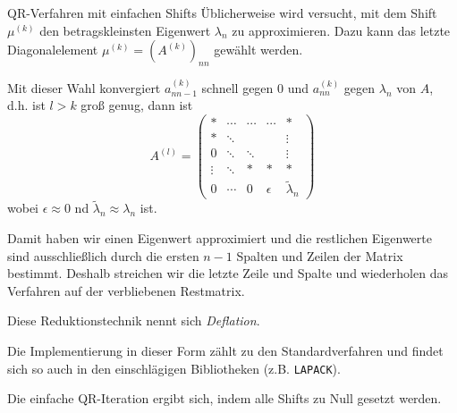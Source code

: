 \begin{defi}{QR-Verfahren mit einfachen Shifts}
    Üblicherweise wird versucht, mit dem Shift $\mu^{(k)}$ den betragskleinsten Eigenwert $\lambda_n$ zu approximieren.
    Dazu kann das letzte Diagonalelement $\mu^{(k)} = (A^{(k)})_{nn}$ gewählt werden.

    Mit dieser Wahl konvergiert $a^{(k)}_{nn-1}$ schnell gegen $0$ und $a^{(k)}_{nn}$ gegen $\lambda_n$ von $A$, d.h. ist $l > k$ groß genug, dann ist
    \[
        A^{(l)} = \begin{pmatrix}
            *      & \cdots & \cdots & \cdots   & *                 \\
            *      & \ddots &        &          & \vdots            \\
            0      & \ddots & \ddots &          & \vdots            \\
            \vdots & \ddots & *      & *        & *                 \\
            0      & \cdots & 0      & \epsilon & \tilde{\lambda}_n
        \end{pmatrix}
    \]
    wobei $\epsilon \approx 0$ nd $\tilde{\lambda}_n \approx \lambda_n$ ist.

    Damit haben wir einen Eigenwert approximiert und die restlichen Eigenwerte sind ausschließlich durch die ersten $n-1$ Spalten und Zeilen der Matrix bestimmt.
    Deshalb streichen wir die letzte Zeile und Spalte und wiederholen das Verfahren auf der verbliebenen Restmatrix.

    Diese Reduktionstechnik nennt sich \emph{Deflation}.

    Die Implementierung in dieser Form zählt zu den Standardverfahren und findet sich so auch in den einschlägigen Bibliotheken (z.B. \texttt{LAPACK}).

    Die einfache QR-Iteration ergibt sich, indem alle Shifts zu Null gesetzt werden.
\end{defi}